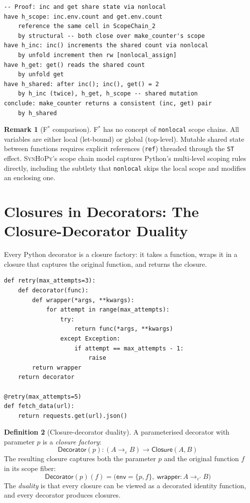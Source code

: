 \documentclass[11pt,a4paper]{report}
\theoremstyle{definition}
\newtheorem{definition}{Definition}[chapter]
\newtheorem{remark}[definition]{Remark}
\theoremstyle{plain}
\newcommand{\fstar}{F$^{*}$}
\newcommand{\synhopy}{\textsc{SynHoPy}}
\begin{document}
\begin{lstlisting}[style=proof]
-- Proof: inc and get share state via nonlocal
have h_scope: inc.env.count and get.env.count
    reference the same cell in ScopeChain_2
    by structural -- both close over make_counter's scope
have h_inc: inc() increments the shared count via nonlocal
    by unfold increment then rw [nonlocal_assign]
have h_get: get() reads the shared count
    by unfold get
have h_shared: after inc(); inc(), get() = 2
    by h_inc (twice), h_get, h_scope -- shared mutation
conclude: make_counter returns a consistent (inc, get) pair
    by h_shared
\end{lstlisting}

\begin{remark}[\fstar{} comparison]
\fstar{} has no concept of \texttt{nonlocal} scope chains.  All variables
are either local (let-bound) or global (top-level).  Mutable shared state
between functions requires explicit references (\lstinline[style=fstar]|ref|)
threaded through the \lstinline[style=fstar]|ST| effect.
\synhopy{}'s scope chain model captures Python's multi-level scoping rules
directly, including the subtlety that \texttt{nonlocal} skips the local scope
and modifies an enclosing one.
\end{remark}

\section{Closures in Decorators: The Closure-Decorator Duality}

Every Python decorator is a closure factory: it takes a function, wraps
it in a closure that captures the original function, and returns the
closure.

\begin{lstlisting}[style=python]
def retry(max_attempts=3):
    def decorator(func):
        def wrapper(*args, **kwargs):
            for attempt in range(max_attempts):
                try:
                    return func(*args, **kwargs)
                except Exception:
                    if attempt == max_attempts - 1:
                        raise
        return wrapper
    return decorator

@retry(max_attempts=5)
def fetch_data(url):
    return requests.get(url).json()
\end{lstlisting}

\begin{definition}[Closure-decorator duality]
A parameterised decorator with parameter $p$ is a \emph{closure factory}:
\[
  \mathsf{Decorator}(p) : (A \to_\varepsilon B) \to \mathsf{Closure}(A, B)
\]
The resulting closure captures both the parameter $p$ and the original
function $f$ in its scope fiber:
\[
  \mathsf{Decorator}(p)(f) =
    \bigl(\mathsf{env} = \{p, f\},\;
      \mathsf{wrapper} : A \to_{\varepsilon'} B\bigr)
\]
The \emph{duality} is that every closure can be viewed as a decorated
identity function, and every decorator produces closures.
\end{definition}
\end{document}

